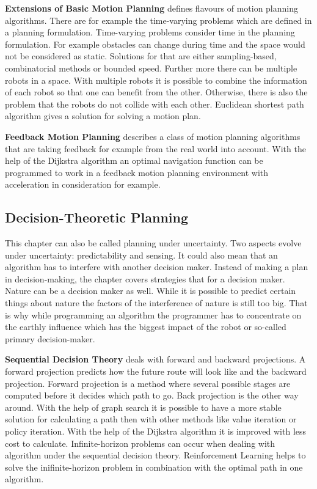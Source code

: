 \textbf{Extensions of Basic Motion Planning} defines flavours of motion planning algorithms. There are for example the time-varying problems which are defined in a planning formulation. Time-varying problems consider time in the planning formulation. For example obstacles can change during time and the space would not be considered as static. Solutions for that are either sampling-based, combinatorial methods or bounded speed. Further more there can be multiple robots in a space. With multiple robots it is possible to combine the information of each robot so that one can benefit from the other. Otherwise, there is also the problem that the robots do not collide with each other. \cite{planning_algorithms_steven_m_lavalle} Euclidean shortest path algorithm gives a solution for solving a motion plan. \cite{efficient_computation_of_euclidean_shortest_paths_in_the_plane}

\textbf{Feedback Motion Planning} describes a class of motion planning algorithms that are taking feedback for example from the real world into account. With the help of the Dijkstra algorithm an optimal navigation function can be programmed to work in a feedback motion planning environment with acceleration in consideration for example. \cite{planning_algorithms_steven_m_lavalle}

\subsection{Decision-Theoretic Planning}

This chapter can also be called planning under uncertainty. Two aspects evolve under uncertainty: predictability and sensing. It could also mean that an algorithm has to interfere with another decision maker. Instead of making a plan in decision-making, the chapter covers strategies that for a decision maker. Nature can be a decision maker as well. While it is possible to predict certain things about nature the factors of the interference of nature is still too big. That is why while programming an algorithm the programmer has to concentrate on the earthly influence which has the biggest impact of the robot or so-called primary decision-maker. \cite{planning_algorithms_steven_m_lavalle}

\textbf{Sequential Decision Theory} deals with forward and backward projections. A forward projection predicts how the future route will look like and the backward projection. Forward projection is a method where several possible stages are computed before it decides which path to go. Back projection is the other way around. With the help of graph search it is possible to have a more stable solution for calculating a path then with other methods like value iteration or policy iteration. With the help of the Dijkstra algorithm it is improved with less cost to calculate. Infinite-horizon problems can occur when dealing with algorithm under the sequential decision theory. Reinforcement Learning helps to solve the inifinite-horizon problem in combination with the optimal path in one algorithm. \cite{planning_algorithms_steven_m_lavalle}

